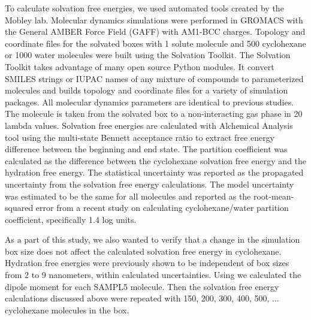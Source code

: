To calculate solvation free energies, we used automated tools created by the Mobley lab.
Molecular dynamics simulations were performed in GROMACS with the General AMBER Force Field (GAFF) with AM1-BCC charges. 
Topology and coordinate files for the solvated boxes with 1 solute molecule and 500 cyclohexane or 1000 water molecules were built using the Solvation Toolkit. %
The Solvation Toolkit takes advantage of many open source Python modules.
It convert SMILES strings or IUPAC names of any mixture of compounds to parameterized molecules and builds topology and coordinate files for a variety of simulation packages. 
All molecular dynamics parameters are identical to previous studies.  %
The molecule is taken from the solvated box to a non-interacting gas phase in 20 lambda values. 
Solvation free energies are calculated with Alchemical Analysis tool %
using the multi-state Bennett acceptance ratio to extract free energy difference between the beginning and end state. 
The partition coefficient was calculated as the difference between the cyclohexane solvation free energy and the hydration free energy.
The statistical uncertainty was reported as the propagated uncertainty from the solvation free energy calculations. 
The model uncertainty was estimated to be the same for all molecules and reported as the root-mean-squared error from a recent study on calculating cyclohexane/water partition coefficient, specifically 1.4 log units.

As a part of this study, we also wanted to verify that a change in the simulation box size does not affect the calculated solvation free energy in cyclohexane. 
Hydration free energies were previously shown to be independent of box sizes from 2 to 9 nanometers, within calculated uncertainties. %
Using %
we calculated the dipole moment for each SAMPL5 molecule. 
Then the solvation free energy calculations discussed above were repeated with 150, 200, 300, 400, 500, ... %
cyclohexane molecules in the box. 


